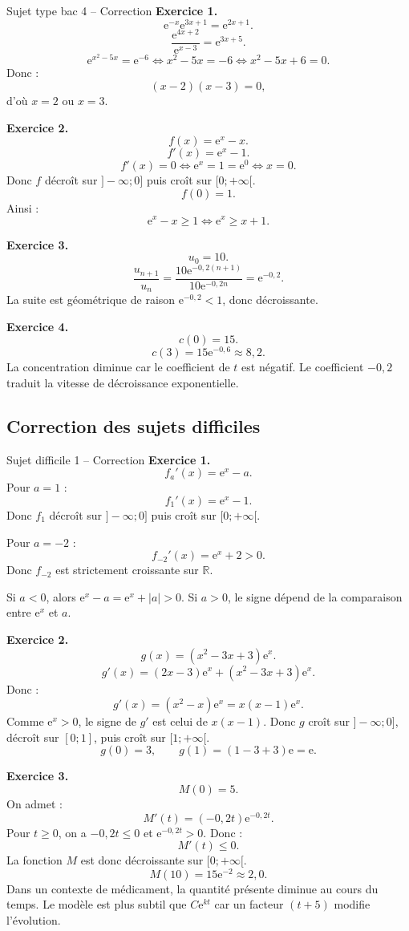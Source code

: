 \documentclass[11pt,a4paper]{article}
\newcommand{\R}{\mathbb{R}}
\newcommand{\e}{\mathrm{e}}
\begin{document}
\begin{correctionbox}{Sujet type bac 4 -- Correction}
\textbf{Exercice 1.}
\[
\e^{-x}\e^{3x+1}=\e^{2x+1}.
\]
\[
\frac{\e^{4x+2}}{\e^{x-3}}=\e^{3x+5}.
\]
\[
\e^{x^2-5x}=\e^{-6}
\Longleftrightarrow x^2-5x=-6
\Longleftrightarrow x^2-5x+6=0.
\]
Donc :
\[
(x-2)(x-3)=0,
\]
d'où $x=2$ ou $x=3$.

\medskip

\textbf{Exercice 2.}
\[
f(x)=\e^x-x.
\]
\[
f'(x)=\e^x-1.
\]
\[
f'(x)=0
\Longleftrightarrow \e^x=1=\e^0
\Longleftrightarrow x=0.
\]
Donc $f$ décroît sur $]-\infty;0]$ puis croît sur $[0;+\infty[$.
\[
f(0)=1.
\]
Ainsi :
\[
\e^x-x\geq1
\Longleftrightarrow
\e^x\geq x+1.
\]

\medskip

\textbf{Exercice 3.}
\[
u_0=10.
\]
\[
\frac{u_{n+1}}{u_n}
=
\frac{10\e^{-0,2(n+1)}}{10\e^{-0,2n}}
=
\e^{-0,2}.
\]
La suite est géométrique de raison $\e^{-0,2}<1$, donc décroissante.

\medskip

\textbf{Exercice 4.}
\[
c(0)=15.
\]
\[
c(3)=15\e^{-0,6}\approx8,2.
\]
La concentration diminue car le coefficient de $t$ est négatif. Le coefficient $-0,2$ traduit la vitesse de décroissance exponentielle.
\end{correctionbox}

\subsection{Correction des sujets difficiles}

\begin{correctionbox}{Sujet difficile 1 -- Correction}
\textbf{Exercice 1.}
\[
f_a'(x)=\e^x-a.
\]
Pour $a=1$ :
\[
f_1'(x)=\e^x-1.
\]
Donc $f_1$ décroît sur $]-\infty;0]$ puis croît sur $[0;+\infty[$.

Pour $a=-2$ :
\[
f_{-2}'(x)=\e^x+2>0.
\]
Donc $f_{-2}$ est strictement croissante sur $\R$.

Si $a<0$, alors $\e^x-a=\e^x+|a|>0$. Si $a>0$, le signe dépend de la comparaison entre $\e^x$ et $a$.

\medskip

\textbf{Exercice 2.}
\[
g(x)=(x^2-3x+3)\e^x.
\]
\[
g'(x)=(2x-3)\e^x+(x^2-3x+3)\e^x.
\]
Donc :
\[
g'(x)=(x^2-x)\e^x=x(x-1)\e^x.
\]
Comme $\e^x>0$, le signe de $g'$ est celui de $x(x-1)$.
Donc $g$ croît sur $]-\infty;0]$, décroît sur $[0;1]$, puis croît sur $[1;+\infty[$.
\[
g(0)=3,
\qquad
g(1)=(1-3+3)\e=\e.
\]

\medskip

\textbf{Exercice 3.}
\[
M(0)=5.
\]
On admet :
\[
M'(t)=(-0,2t)\e^{-0,2t}.
\]
Pour $t\geq0$, on a $-0,2t\leq0$ et $\e^{-0,2t}>0$.
Donc :
\[
M'(t)\leq0.
\]
La fonction $M$ est donc décroissante sur $[0;+\infty[$.
\[
M(10)=15\e^{-2}\approx2,0.
\]
Dans un contexte de médicament, la quantité présente diminue au cours du temps. Le modèle est plus subtil que $C\e^{kt}$ car un facteur $(t+5)$ modifie l'évolution.
\end{correctionbox}
\end{document}
